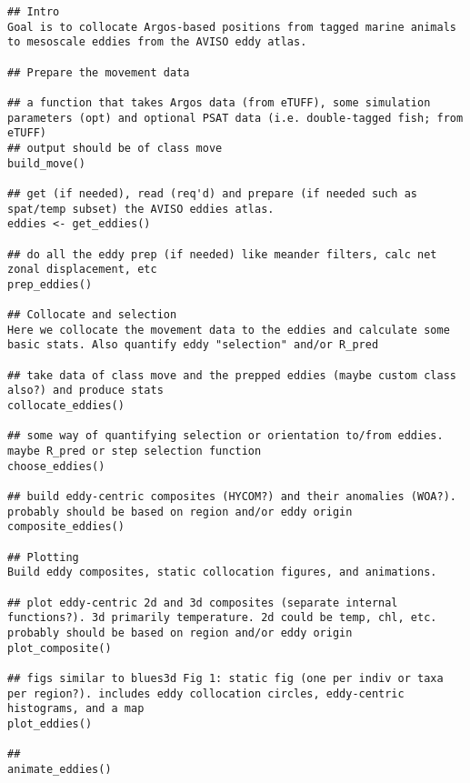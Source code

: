 \begin{verbatim}
## Intro
Goal is to collocate Argos-based positions from tagged marine animals to mesoscale eddies from the AVISO eddy atlas.

## Prepare the movement data

## a function that takes Argos data (from eTUFF), some simulation parameters (opt) and optional PSAT data (i.e. double-tagged fish; from eTUFF)
## output should be of class move
build_move()

## get (if needed), read (req'd) and prepare (if needed such as spat/temp subset) the AVISO eddies atlas.
eddies <- get_eddies()

## do all the eddy prep (if needed) like meander filters, calc net zonal displacement, etc
prep_eddies()

## Collocate and selection
Here we collocate the movement data to the eddies and calculate some basic stats. Also quantify eddy "selection" and/or R_pred

## take data of class move and the prepped eddies (maybe custom class also?) and produce stats
collocate_eddies()

## some way of quantifying selection or orientation to/from eddies. maybe R_pred or step selection function
choose_eddies()

## build eddy-centric composites (HYCOM?) and their anomalies (WOA?). probably should be based on region and/or eddy origin
composite_eddies()

## Plotting
Build eddy composites, static collocation figures, and animations.

## plot eddy-centric 2d and 3d composites (separate internal functions?). 3d primarily temperature. 2d could be temp, chl, etc. probably should be based on region and/or eddy origin
plot_composite()

## figs similar to blues3d Fig 1: static fig (one per indiv or taxa per region?). includes eddy collocation circles, eddy-centric histograms, and a map
plot_eddies()

## 
animate_eddies()


\end{verbatim}











